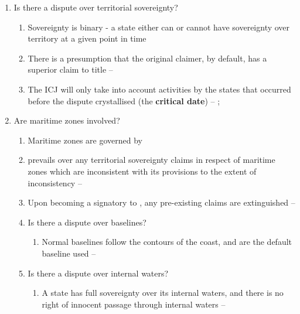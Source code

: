\begin{enumerate}
\begin{enumerate}
    \end{enumerate}
    \item Is there a dispute over territorial sovereignty?
    \begin{enumerate}
        \item Sovereignty is binary - a state either can or cannot have sovereignty over territory at a given point in time
        \item There is a presumption that the original claimer, by default, has a superior claim to title -- 
        \item The ICJ will only take into account activities by the states that occurred before the dispute crystallised (the \textbf{critical date}) -- ; 
    \end{enumerate}
    \item Are maritime zones involved?
    \begin{enumerate}
        \item Maritime zones are governed by 
        \item {} prevails over any territorial sovereignty claims in respect of maritime zones which are inconsistent with its provisions to the extent of inconsistency -- 
        \item Upon becoming a signatory to , any pre-existing claims are extinguished -- 
        \item Is there a dispute over baselines?
        \begin{enumerate}
            \item Normal baselines follow the contours of the coast, and are the default baseline used -- 
        \end{enumerate}
        \item Is there a dispute over internal waters?
        \begin{enumerate}
            \item A state has full sovereignty over its internal waters, and there is no right of innocent passage through internal waters -- 

\end{enumerate}
\end{enumerate}
\end{enumerate}
